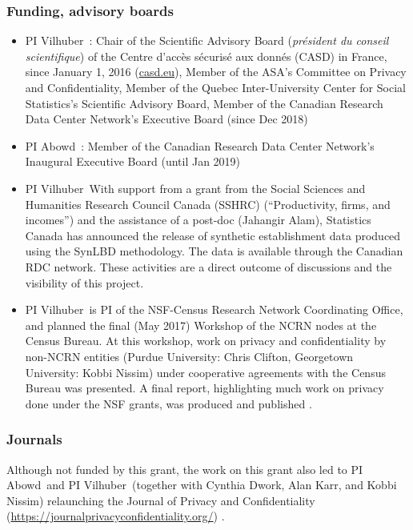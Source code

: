 \documentclass[12pt]{article}
\newcommand{\TheLars}{PI Vilhuber~}
\newcommand{\TheJohn}{PI Abowd~}
\begin{document}
\subsubsection*{Funding, advisory boards}
\begin{itemize}
	\item \TheLars: Chair of the Scientific Advisory Board ({\it pr\'esident du conseil scientifique}) of the Centre d'acc\`es 	s\'ecuris\'e aux donn\'es (CASD) in France, since January 1, 2016 (\url{casd.eu}), Member of the ASA's Committee on Privacy and Confidentiality, Member of the Quebec Inter-University Center for Social Statistics's Scientific Advisory Board, Member of the Canadian Research Data Center Network's  Executive Board (since Dec 2018)
	\item \TheJohn: Member of the Canadian Research Data Center Network's Inaugural Executive Board (until Jan 2019)
	\item \TheLars With support from a  grant from the Social Sciences and Humanities Research Council Canada (SSHRC) (``Productivity, firms, and incomes'') and the assistance of a post-doc (Jahangir Alam), Statistics Canada has announced the  release of synthetic establishment data produced using the SynLBD methodology. The data is available through the Canadian RDC network. These activities are a direct outcome of discussions and the visibility of this project.
	\item \TheLars is PI of the NSF-Census Research Network Coordinating Office, and planned the final (May 2017) Workshop of the NCRN nodes at the Census Bureau. At this workshop, work on privacy and confidentiality by non-NCRN entities (Purdue University: Chris Clifton, Georgetown University: Kobbi Nissim) under cooperative agreements with the Census Bureau was presented. A final report, highlighting much work on privacy done under the NSF grants, was produced and published \parencite{ncrn-summary}.

\end{itemize}

\subsubsection*{Journals}
Although not funded by this grant, the work on this grant also led to \TheJohn and \TheLars (together with Cynthia Dwork, Alan Karr, and Kobbi Nissim) relaunching the Journal of Privacy and Confidentiality (\url{https://journalprivacyconfidentiality.org/}) \parencite[see ][]{Vilhuber2018,Slavkovic2018}.
\end{document}

